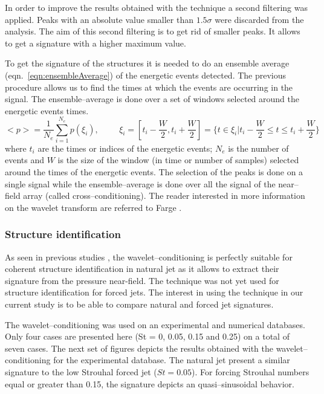 \documentclass[english]{aiaa-tc}
\begin{document}
In order to improve the results obtained with the technique a second filtering was applied.
Peaks with an absolute value smaller than $1.5\sigma$ were discarded from the analysis.
The aim of this second filtering is to get rid of smaller peaks. It allows to get a signature with a higher maximum value.

To get the signature of the structures it is needed to do an ensemble average (eqn.~\ref{eqn:ensembleAverage}) of the energetic events detected.
The previous procedure allows us to find the times at which the events are occurring in the signal. The ensemble--average is done over a set of windows selected around the energetic events times.
\begin{equation} \label{eqn:ensembleAverage}
<p> = \frac{1}{N_{e}} \sum_{i=1}^{N_{e}} p\left(\xi_{i} \right), \hspace{1cm} \xi_{i} = \left[ t_{i}-\frac{W}{2}, t_{i}+\frac{W}{2}\right] = \{ t \in \xi_{i} | t_{i}-\frac{W}{2} \leq t \leq t_{i}+\frac{W}{2}\}
\end{equation}
where $t_{i}$ are the times or indices of the energetic events; $N_{e}$ is the number of events and $W$ is the size of the window (in time or number of samples) selected around the times of the energetic events.
The selection of the peaks is done on a single signal while the ensemble--average is done over all the signal of the near--field array (called cross--conditioning).
The reader interested in more information on the wavelet transform are referred to Farge \cite{Farge1992}.

\subsubsection{Structure identification}
As seen in previous studies \cite{Camussi1997,Camussi1997b,Camussi2002}, the wavelet--conditioning is perfectly suitable for coherent structure identification in natural jet as it allows to extract their signature from the pressure near-field.
The technique was not yet used for structure identification for forced jets.
The interest in using the technique in our current study is to be able to compare natural and forced jet signatures.

The wavelet--conditioning was used on an experimental and numerical databases.
Only four cases are presented here (St = 0, 0.05, 0.15 and 0.25) on a total of seven cases.
The next set of figures depicts the results obtained with the wavelet--conditioning for the experimental database.
The natural jet present a similar signature to the low Strouhal forced jet ($St = 0.05$).
For forcing Strouhal numbers equal or greater than 0.15, the signature depicts an quasi--sinusoidal behavior.
\end{document}

